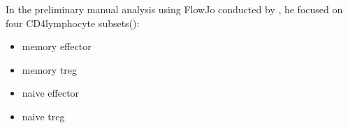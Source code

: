 In the preliminary manual analysis using FlowJo conducted by ,
he focused on four CD4\positive lymphocyte subsets():
\begin{itemize}
  \item memory effector
  \item memory treg
  \item naive effector
  \item naive treg
\end{itemize}

% 
\hspace{-2cm}
